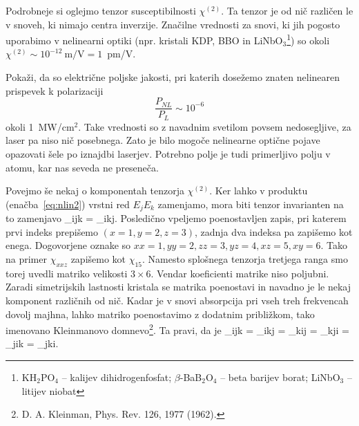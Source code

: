 Podrobneje si oglejmo tenzor susceptibilnosti $\chi^{(2)}$. 
Ta tenzor je od nič različen le v snoveh, ki nimajo centra inverzije. Značilne 
vrednosti za snovi, ki jih pogosto uporabimo v nelinearni optiki (npr. kristali 
KDP, BBO in LiNbO$_3$\footnote{KH$_2$PO$_4$ -- kalijev dihidrogenfosfat; $\beta$-BaB$_2$O$_4$ --
beta barijev borat; LiNbO$_3$ -- litijev niobat}) so okoli $\chi^{(2)} 
\sim 10^{-12}~\textrm{m/V} = 1$~pm/V.

\begin{definition}
Pokaži, da so električne poljske jakosti, pri katerih dosežemo znaten nelinearen 
prispevek k polarizaciji 
 $$
 \frac{P_{NL}}{P_L} \sim 10^{-6}$$ 
okoli 1~MW/cm$^2$. 
Take vrednosti so z navadnim svetilom 
povsem nedosegljive, za laser pa niso nič posebnega.
Zato je bilo mogoče nelinearne
optične pojave opazovati šele po iznajdbi laserjev. Potrebno polje
je tudi primerljivo polju v atomu, kar nas seveda ne preseneča.
\end{definition}

Povejmo še nekaj o komponentah tenzorja $\chi^{(2)}$. 
Ker lahko v produktu (enačba~\ref{eq:nlin2}) vrstni red $E_j E_k$ zamenjamo, mora biti
tenzor invarianten na to zamenjavo
\beq
\chi_{ijk} = \chi_{ikj}.
\eeq
Posledično vpeljemo poenostavljen zapis, pri katerem prvi indeks prepišemo $(x = 1, y = 2, z = 3)$,
zadnja dva indeksa pa zapišemo kot enega. Dogovorjene oznake so $xx = 1, yy = 2, zz = 3, yz = 4, 
xz = 5, xy = 6$. Tako na primer $\chi_{xxz}$ zapišemo kot $\chi_{15}$. Namesto
splošnega tenzorja tretjega ranga smo torej uvedli matriko velikosti $3\times6$. 
Vendar koeficienti matrike niso poljubni. Zaradi simetrijskih lastnosti kristala se matrika
poenostavi in navadno je le nekaj komponent različnih od nič. 
Kadar je v snovi absorpcija pri vseh treh frekvencah dovolj majhna, lahko matriko poenostavimo
z dodatnim približkom, tako imenovano  
 Kleinmanovo domnevo\footnote{D. A. Kleinman, Phys. Rev. 126, 1977 (1962).}.
Ta pravi, da je 
\beq
\chi_{ijk} = \chi_{ikj} = \chi_{kij} = \chi_{kji} = \chi_{jik} = \chi_{jki}.
\eeq

